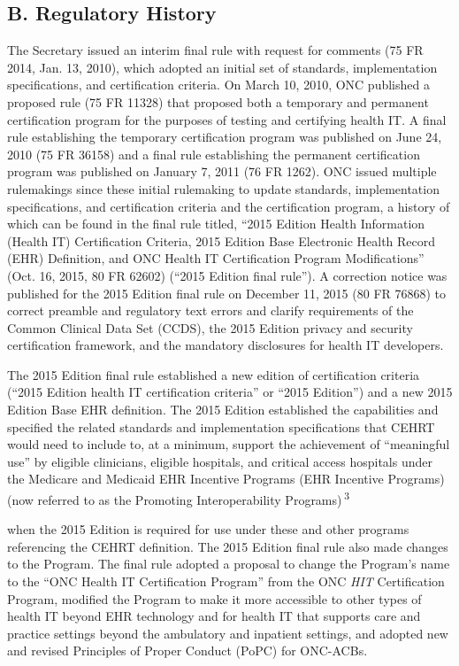 \documentclass[twoside,11pt]{article}
\begin{document}
          \subsection{B. Regulatory History}

          The Secretary issued an interim final rule with request for comments (75 FR 2014, Jan. 13, 2010), which adopted an initial set of standards, implementation specifications, and certification criteria. On March 10, 2010, ONC published a proposed rule (75 FR 11328) that proposed both a temporary and permanent certification program for the purposes of testing and certifying health IT. A final rule establishing the temporary certification program was published on June 24, 2010 (75 FR 36158) and a final rule establishing the permanent certification program was published on January 7, 2011 (76 FR 1262). ONC issued multiple rulemakings since these initial rulemaking to update standards, implementation specifications, and certification criteria and the certification program, a history of which can be found in the final rule titled, “2015 Edition Health Information (Health IT) Certification Criteria, 2015 Edition Base Electronic Health Record (EHR) Definition, and ONC Health IT Certification Program Modifications” (Oct. 16, 2015, 80 FR 62602) (“2015 Edition final rule”). A correction notice was published for the 2015 Edition final rule on December 11, 2015 (80 FR 76868) to correct preamble and regulatory text errors and clarify requirements of the Common Clinical Data Set (CCDS), the 2015 Edition privacy and security certification framework, and the mandatory disclosures for health IT developers.


          The 2015 Edition final rule established a new edition of certification criteria (“2015 Edition health IT certification criteria” or “2015 Edition”) and a new 2015 Edition Base EHR definition. The 2015 Edition established the capabilities and specified the related standards and implementation specifications that CEHRT would need to include to, at a minimum, support the achievement of “meaningful use” by eligible clinicians, eligible hospitals, and critical access hospitals under the Medicare and Medicaid EHR Incentive Programs (EHR Incentive Programs) (now referred to as the Promoting Interoperability Programs) \textsuperscript{3}

             when the 2015 Edition is required for use under these and other programs referencing the CEHRT definition. The 2015 Edition final rule also made changes to the Program. The final rule adopted a proposal to change the Program's name to the “ONC Health IT Certification Program” from the ONC \emph{HIT} Certification Program, modified the Program to make it more accessible to other types of health IT beyond EHR technology and for health IT that supports care and practice settings beyond the ambulatory and inpatient settings, and adopted new and revised Principles of Proper Conduct (PoPC) for ONC-ACBs.
\end{document}
